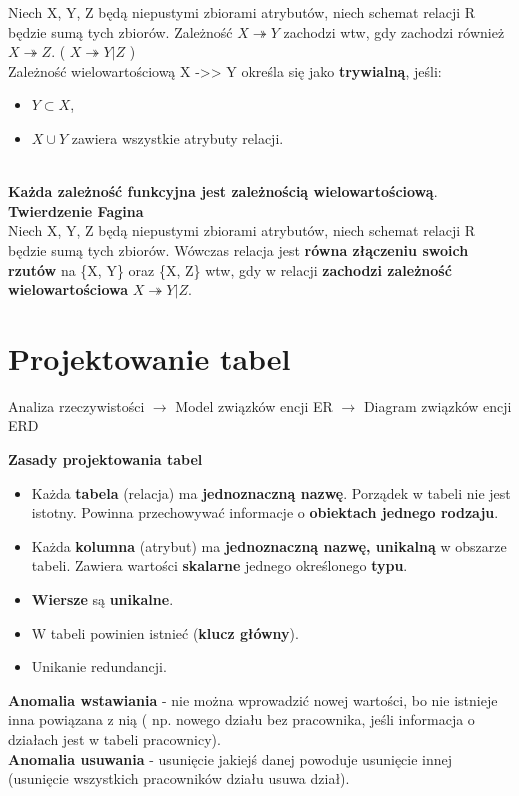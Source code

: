 \documentclass[a4paper]{article}
\begin{document}
Niech X, Y, Z będą niepustymi zbiorami atrybutów, niech schemat relacji R będzie sumą tych zbiorów. Zależność $X \twoheadrightarrow Y$ zachodzi wtw, gdy zachodzi również $X \twoheadrightarrow Z$. ( $X \twoheadrightarrow Y | Z$ )\\

Zależność wielowartościową X ->> Y określa się jako \textbf{trywialną}, jeśli:
\begin{itemize}
    \item $Y \subset X$,
    \item $X \cup Y$ zawiera wszystkie atrybuty relacji.
\end{itemize}
\hfill \\
\textbf{Każda zależność funkcyjna jest zależnością wielowartościową}.\\

\textbf{Twierdzenie Fagina}\\
Niech X, Y, Z będą niepustymi zbiorami atrybutów, niech schemat relacji R będzie sumą tych zbiorów. Wówczas relacja jest \textbf{równa złączeniu swoich rzutów} na \{X, Y\} oraz \{X, Z\} wtw, gdy w relacji \textbf{zachodzi zależność wielowartościowa} $X \twoheadrightarrow Y | Z$.

\section{Projektowanie tabel}
Analiza rzeczywistości $\rightarrow$
Model związków encji ER $\rightarrow$
Diagram związków encji ERD

\textbf{Zasady projektowania tabel}
\begin{itemize}
    \item Każda \textbf{tabela} (relacja) ma \textbf{jednoznaczną nazwę}. Porządek w tabeli nie jest istotny. Powinna przechowywać informacje o \textbf{obiektach jednego rodzaju}.
    \item Każda \textbf{kolumna} (atrybut) ma \textbf{jednoznaczną nazwę, unikalną} w obszarze tabeli. Zawiera wartości \textbf{skalarne} jednego określonego \textbf{typu}.
    \item \textbf{Wiersze} są \textbf{unikalne}.
    \item W tabeli powinien istnieć (\textbf{klucz główny}).
    \item Unikanie redundancji.
\end{itemize}

\textbf{Anomalia wstawiania} - nie można wprowadzić nowej wartości, bo nie istnieje inna powiązana z nią ( np. nowego działu bez pracownika, jeśli informacja o działach jest w tabeli pracownicy).
\\
\textbf{Anomalia usuwania} - usunięcie jakiejś danej powoduje usunięcie innej (usunięcie wszystkich pracowników działu usuwa dział).\\
\end{document}
